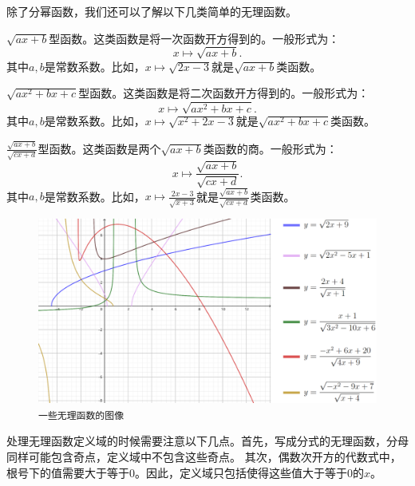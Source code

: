 \documentclass[12pt,UTF8]{ctexbook}
\begin{document}
除了分幂函数，我们还可以了解以下几类简单的无理函数。

$\sqrt{ax + b}$型函数。这类函数是将一次函数开方得到的。一般形式为：
$$ x\mapsto \sqrt{ax + b}.$$
其中$a, b$是常数系数。比如，$x\mapsto \sqrt{2x - 3}$就是$\sqrt{ax + b}$类函数。

$\sqrt{ax^2 + bx + c}$型函数。这类函数是将二次函数开方得到的。一般形式为：
$$ x\mapsto \sqrt{ax^2 + bx + c}.$$
其中$a, b$是常数系数。比如，$x\mapsto \sqrt{x^2 + 2x - 3}$就是$\sqrt{ax^2 + bx + c}$类函数。

$\frac{\sqrt{ax + b}}{\sqrt{cx + d}}$型函数。这类函数是两个$\sqrt{ax + b}$类函数的商。一般形式为：
$$ x\mapsto \frac{\sqrt{ax + b}}{\sqrt{cx + d}}.$$
其中$a, b$是常数系数。比如，$x\mapsto \frac{2x - 3}{\sqrt{x + 3}}$就是$\frac{\sqrt{ax + b}}{\sqrt{cx + d}}$类函数。

\begin{figure}[h]
    \vspace{4pt}
    \centering
    \includegraphics[width=0.96
    \textwidth]{tu/无理函数1.png}
    \caption*{\texttt{一些无理函数的图像}}
\end{figure}

处理无理函数定义域的时候需要注意以下几点。首先，写成分式的无理函数，分母同样可能包含奇点，定义域中不包含这些奇点。
其次，偶数次开方的代数式中，根号下的值需要大于等于$0$。因此，定义域只包括使得这些值大于等于$0$的$x$。
\end{document}
